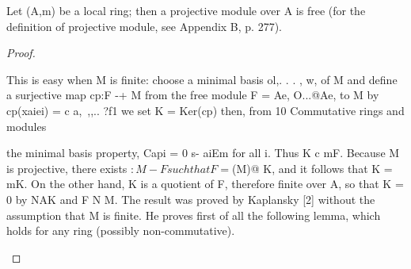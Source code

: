 \begin{theorem}[Theorem 2.5]\label{mcrt-auto-theorem-2-5}\uses{}
\begin{mathematicalrecord}
Let (A,m) be a local ring; then a projective module over A
is free (for the definition of projective module, see Appendix B, p. 277).
\end{mathematicalrecord}
\end{theorem}
\begin{proof}
\begin{mathematicalrecord}
This is easy when M is finite: choose a minimal basis ol,. . . , w, of
M and define a surjective map cp:F -+ M from the free module F =
Ae, O...@Ae, to M by cp(xaiei) = c a,~,,.. ?f1 we set K = Ker(cp) then, from
10       Commutative      rings and modules

the minimal     basis property,
         Capi     = 0 s- aiEm      for all i.
Thus K c mF. Because M is projective, there exists $: M -F     such that
F = $(M)@    K, and it follows that K = mK. On the other hand, K is a
quotient of F, therefore finite over A, so that K = 0 by NAK and F N M.
  The result was proved by Kaplansky [2] without the assumption that
M is finite. He proves first of all the following lemma, which holds for
any ring (possibly non-commutative).


\end{mathematicalrecord}
\end{proof}
